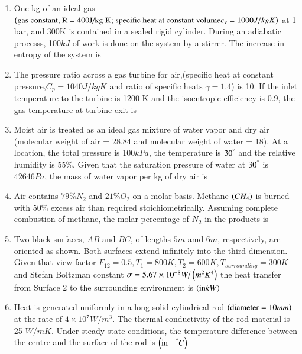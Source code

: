 \documentclass[journal,12pt,onecolumn]{IEEEtran}
\theoremstyle{remark}
\begin{document}
\begin{enumerate}
    \item One kg of an ideal gas $\left(\textnormal{gas constant, R = 400J/kg K; specific
        heat at constant volume} c_v = 1000 J/kg K\right)$ at 1 bar, and 300K is contained in a sealed rigid 
        cylinder. During an adiabatic processs, 100$kJ$ of work is done on the system by a stirrer. 
        The increase in entropy of the system is 
        \hfill{}
   \\     
    \item The pressure ratio across a gas turbine for air,(specific heat at constant pressure,$C_p = 1040J/kg K$ and ratio of specific heats $\gamma = 1.4$) is
        10. If the inlet temperature to the turbine is 1200 K and the isoentropic efficiency is 0.9, the gas 
        temperature at turbine exit is 
        \hfill{}
   \\     
        
    \item Moist air is treated as an ideal gas mixture of water vapor and dry air 
        (molecular weight of air = 28.84 and molecular weight of water = 18). At a 
        location, the total pressure is 100$kPa$, the temperature is $30 ^{\degree}$ and the 
        relative humidity is $55\%$. Given that the saturation pressure of water at $30 ^{\degree}$
        is $42646 Pa$, the mass of water vapor per kg of dry air is
        \hfill{}
        

    \item Air contains $79\% N_2$ and $21 \% O_2$ on a molar basis. Methane $\left(CH_4\right)$ is 
        burned with $50\%$ excess air than required stoichiometrically. Assuming complete combustion 
        of methane, the molar percentage of $N_2$ in the products is
        \hfill{}
        
    \item Two black surfaces, $AB$ and $BC$, of lengths $5m$ amd $6m$, respectively, are oriented as shown.
        Both surfaces extend infinitely into the third dimension. Given that view factor 
        $F_{12} = 0.5, T_1 = 800K, T_2 = 600K, T_{surrounding} = 300K$ and Stefan Boltzman constant
        $\sigma = 5.67 \times 10^{-8} W/\left(m^2 K^4\right)$ the heat transfer from Surface 2 to the surrounding
        environment is $\left(\text{in} kW\right)$
        \hfill{}
        \begin{center}
            \resizebox{0.5\textwidth}{!}{
                
            } 
        \end{center} 
    \item Heat is generated uniformly in a long solid cylindrical rod $\left(\text{diameter} = 10mm\right)$
        at the rate of $4 \times 10^7 W/m^3$. The thermal conductivity of the rod material is 25 $W/m K$. Under
        steady state conditions, the temperature difference between the centre and the surface of the rod is
        $\left(\text{in} \quad^{\degree}C\right)$
        \hfill{}


\end{enumerate}
\end{document}
